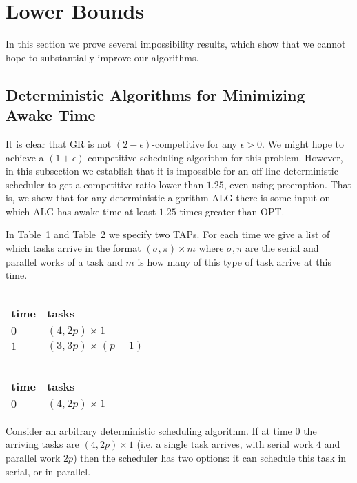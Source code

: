 \section{Lower Bounds}
\label{sec:lowerbounds}

In this section we prove several impossibility results, which
show that we cannot hope to substantially improve our algorithms.

\subsection{Deterministic Algorithms for Minimizing Awake Time}
It is clear that GR is not $(2-\epsilon)$-competitive for any
$\epsilon > 0$. We might hope to achieve a
$(1+\epsilon)$-competitive scheduling algorithm for this problem.
However, in this subsection we establish that it is impossible
for an off-line deterministic scheduler to get a competitive
ratio lower than $1.25$, even using preemption. That is, we show
that for any deterministic algorithm ALG there is some input on
which ALG has awake time at least $1.25$ times greater than OPT. 

In Table~\ref{tab:lowerboundFork1} and
Table~\ref{tab:lowerboundFork2} we specify two TAPs.
For each time we give a list of which tasks arrive in the format
$(\sigma, \pi)\times m$ where $\sigma, \pi$ are the serial and
parallel works of a task and $m$ is how many of this type of task
arrive at this time.

\begin{table}[H]
\caption{}
\label{tab:lowerboundFork1}
\centering
\begin{tabular}{|l|l|}
\hline
time & tasks                    \\ \hline
$0$  & $(4, 2p) \times 1$       \\ \hline
$1$  & $(3, 3p) \times (p-1)$ \\ \hline
\end{tabular}
\end{table}

\begin{table}[H]
\caption{}
\label{tab:lowerboundFork2}
\centering
\begin{tabular}{|l|l|}
\hline
time & tasks                    \\ \hline
$0$  & $(4, 2p) \times 1$       \\ \hline
\end{tabular}
\end{table}

Consider an arbitrary deterministic scheduling algorithm. If at
time $0$ the arriving tasks are $(4, 2p)\times 1$ (i.e. a single
task arrives, with serial work $4$ and parallel work $2p$) then
the scheduler has two options: it can schedule this task in
serial, or in parallel.

